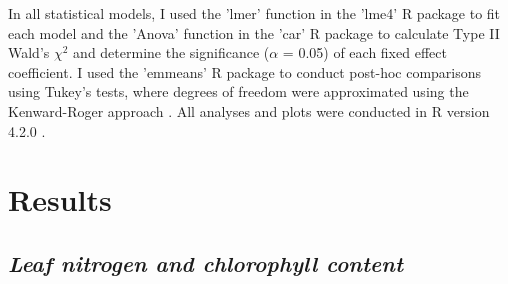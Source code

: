 In all statistical models, I used the 'lmer' function in the 'lme4' R package  to fit each model and the 'Anova' function in the 'car' R package  to calculate Type II Wald's $\chi^{2}$ and determine the significance ($\alpha$ = 0.05) of each fixed effect coefficient. I used the 'emmeans' R package  to conduct post-hoc comparisons using Tukey's tests, where degrees of freedom were approximated using the Kenward-Roger approach . All analyses and plots were conducted in R version 4.2.0 .

\section{Results}
\subsection{\textit{Leaf nitrogen and chlorophyll content}}
